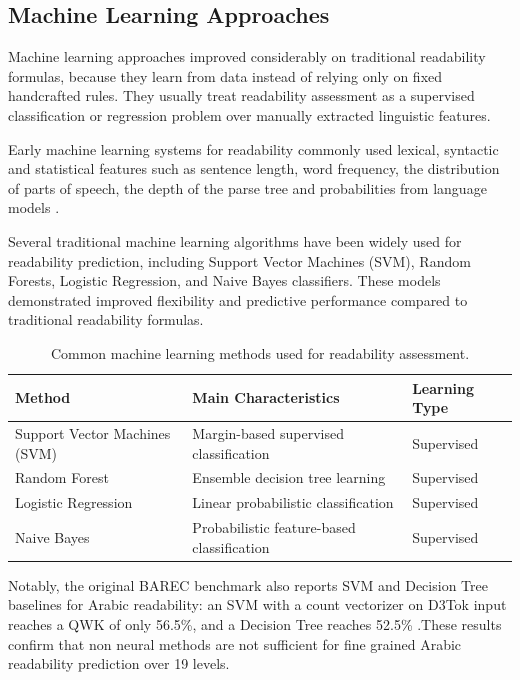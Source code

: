 \documentclass[12pt]{report}
\begin{document}
\subsection{Machine Learning Approaches}

Machine learning approaches improved considerably on traditional readability formulas, because they learn from data instead of relying only on fixed handcrafted rules. They usually treat readability assessment as a supervised classification or regression problem over manually extracted linguistic features.

Early machine learning systems for readability commonly used lexical, syntactic and statistical features such as sentence length, word frequency, the distribution of parts of speech, the depth of the parse tree and probabilities from language models \cite{schwarm2005reading}.

Several traditional machine learning algorithms have been widely used for readability prediction, including Support Vector Machines (SVM), Random Forests, Logistic Regression, and Naive Bayes classifiers. These models demonstrated improved flexibility and predictive performance compared to traditional readability formulas.

\begin{table}[H]

\centering

\caption{Common machine learning methods used for readability assessment.}

\label{tab:ml_readability}

\begin{tabular}{p{4cm} p{7cm} p{2.5cm}}

\toprule

\textbf{Method} & \textbf{Main Characteristics} & \textbf{Learning Type} \\

\midrule

Support Vector Machines (SVM) & Margin-based supervised classification & Supervised \\

Random Forest & Ensemble decision tree learning & Supervised \\

Logistic Regression & Linear probabilistic classification & Supervised \\

Naive Bayes & Probabilistic feature-based classification & Supervised \\

\bottomrule

\end{tabular}

\end{table}
Notably, the original BAREC benchmark also reports SVM and Decision Tree baselines for Arabic readability: an SVM with a count vectorizer on D3Tok input reaches a QWK of only 56.5\%, and a Decision Tree reaches 52.5\% \cite{elmadani2025barec}.These results confirm that non neural methods are not sufficient for fine grained Arabic readability prediction over 19 levels.
\end{document}
